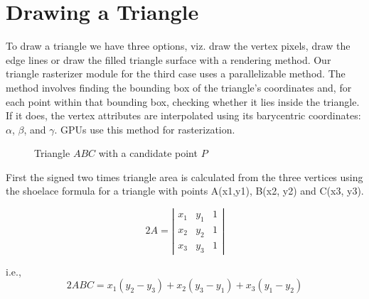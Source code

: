 \clearpage %

\section{Drawing a Triangle}
To draw a triangle we have three options, viz. draw the vertex pixels, draw the edge lines or draw the filled triangle surface with a rendering method. 
Our triangle rasterizer module for the third case uses a parallelizable method. The method involves finding the bounding box of the triangle's coordinates and, for each point within that bounding box, checking whether it lies inside the triangle. If it does, the vertex attributes are interpolated using its barycentric coordinates: $\alpha$, $\beta$, and $\gamma$. GPUs use this method for rasterization.



\begin{figure}[h!]
\centering
{}
\caption{Triangle $ABC$ with a candidate point $P$}
\end{figure}


First the signed two times triangle area is calculated from the three vertices using the shoelace formula for a triangle with points A(x1,y1), B(x2, y2) and C(x3, y3). 

\[
2A = \left| 
\begin{array}{ccc}
x_1 & y_1 & 1 \\
x_2 & y_2 & 1 \\
x_3 & y_3 & 1 
\end{array}
\right|
\]

i.e.,
\[
2ABC = x_1(y_2 - y_3) + x_2(y_3 - y_1) + x_3(y_1 - y_2)
\]

